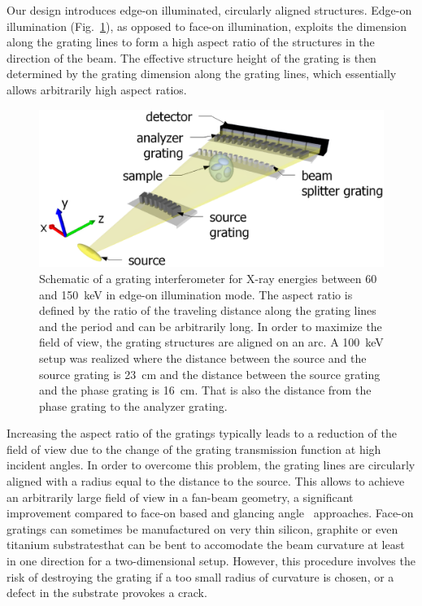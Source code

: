 Our design introduces edge-on illuminated,  circularly aligned structures.
Edge-on illumination (Fig.~\ref{fig:schematic}), as
opposed to face-on illumination, exploits the dimension along the grating
lines to form a high aspect ratio of the structures in the direction of the beam. The
effective structure height of the grating is then determined by the grating
dimension along the grating lines, which essentially allows arbitrarily high
aspect ratios. 
\begin{figure}[h!]
    \centering
    \includegraphics[width=\textwidth]{gfx/figure1.eps}
    \caption{Schematic of a grating
        interferometer for X-ray energies between 60 and
        \SI{150}{\kilo\electronvolt} in edge-on illumination mode. The
        aspect ratio is defined by the ratio of the traveling distance along the
        grating lines and the period and can be arbitrarily long. In order to maximize
        the field of view, the grating structures are aligned on an
        arc. A \SI{100}{\kilo\eV} setup was realized where the distance
        between the source and the source grating is \SI{23}{\centi\metre}
    and the distance between the source grating and the phase grating is
    \SI{16}{\centi\metre}. That is also the distance from the phase grating
to the analyzer grating.}%
\label{fig:schematic}
\end{figure}

Increasing the aspect ratio of the gratings typically leads to a reduction
of the field of view due to the change of the grating transmission function
at high incident angles. In order to overcome this problem, the grating
lines are circularly aligned with a radius equal to the distance to the
source. This allows to achieve an arbitrarily large field of view in a
fan-beam geometry, a significant improvement compared to face-on based and
glancing angle~\parencite{Stutman2012a} approaches.
Face-on gratings can sometimes be manufactured on very thin silicon,
graphite or even titanium substrates\cn that can be bent to accomodate the beam
curvature at least in one direction for a two-dimensional setup. However,
this procedure involves the risk of destroying the grating if a too small
radius of curvature is chosen, or a defect in the substrate provokes a
crack.                                                

